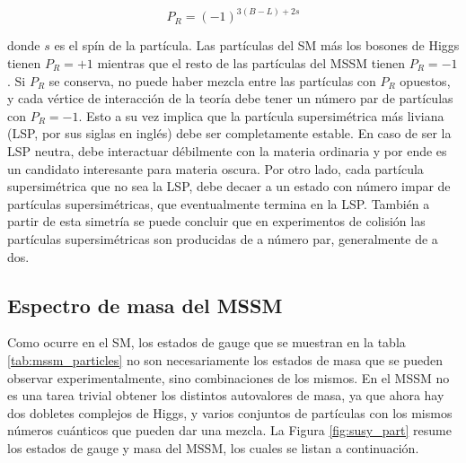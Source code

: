 \begin{equation}
	P_R = (-1)^{3(B-L)+2s}
\end{equation}

\noindent
donde $s$ es el spín de la partícula. Las partículas del SM más los bosones de Higgs tienen $P_R = +1$ mientras que el resto de las partículas del MSSM tienen $P_R = -1$. Si $P_R$ se conserva, no puede haber mezcla entre las partículas con $P_R$ opuestos, y cada vértice de interacción de la teoría debe tener un número par de partículas con $P_R=-1$. Esto a su vez implica que la partícula supersimétrica más liviana (LSP, por sus siglas en inglés) debe ser completamente estable. En caso de ser la LSP neutra, debe interactuar débilmente con la materia ordinaria y por ende es un candidato interesante para materia oscura. Por otro lado, cada partícula supersimétrica que no sea la LSP, debe decaer a un estado con número impar de partículas supersimétricas, que eventualmente termina en la LSP. También a partir de esta simetría se puede concluir que en experimentos de colisión las partículas supersimétricas son producidas de a número par, generalmente de a dos.



\subsection{Espectro de masa del MSSM}

Como ocurre en el SM, los estados de gauge que se muestran en la tabla \ref{tab:mssm_particles} no son necesariamente los estados de masa que se pueden observar experimentalmente, sino combinaciones de los mismos. En el MSSM no es una tarea trivial obtener los distintos autovalores de masa, ya que ahora hay dos dobletes complejos de Higgs, y varios conjuntos de partículas con los mismos números cuánticos que pueden dar una mezcla. La Figura \ref{fig:susy_part} resume los estados de gauge y masa del MSSM, los cuales se listan a continuación.

